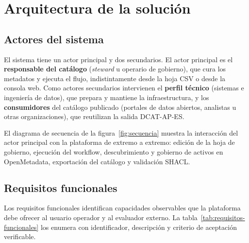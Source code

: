 \section{Arquitectura de la solución}\label{cap:arquitectura}

\subsection{Actores del sistema}\label{sec:actores}

El sistema tiene un actor principal y dos secundarios. El actor principal es el \textbf{responsable del catálogo} (\emph{steward} u operario de gobierno), que cura los metadatos y ejecuta el flujo, indistintamente desde la hoja CSV o desde la consola web. Como actores secundarios intervienen el \textbf{perfil técnico} (sistemas e ingeniería de datos), que prepara y mantiene la infraestructura, y los \textbf{consumidores} del catálogo publicado (portales de datos abiertos, analistas u otras organizaciones), que reutilizan la salida DCAT-AP-ES.

El diagrama de secuencia de la figura~\ref{fig:secuencia} muestra la interacción del actor principal con la plataforma de extremo a extremo: edición de la hoja de gobierno, ejecución del workflow, descubrimiento y gobierno de activos en OpenMetadata, exportación del catálogo y validación SHACL.


\subsection{Requisitos funcionales}\label{sec:requisitos-funcionales}

Los requisitos funcionales identifican capacidades observables que la plataforma debe ofrecer al usuario operador y al evaluador externo. La tabla~\ref{tab:requisitos-funcionales} los enumera con identificador, descripción y criterio de aceptación verificable.

